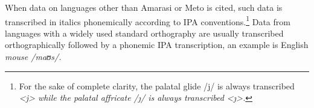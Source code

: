 When data on languages other than Amarasi or Meto is cited,
such data is transcribed in italics phonemically according to IPA conventions.\footnote{
		For the sake of complete clarity, the palatal glide /j/
		is always transcribed \it{<j>} while the 
		palatal affricate /\j/ is always transcribed \it{<\j>}.}
Data from languages with a widely used standard
orthography are usually transcribed orthographically followed
by a phonemic IPA transcription, an example is English \it{mouse} /maʊs/.
